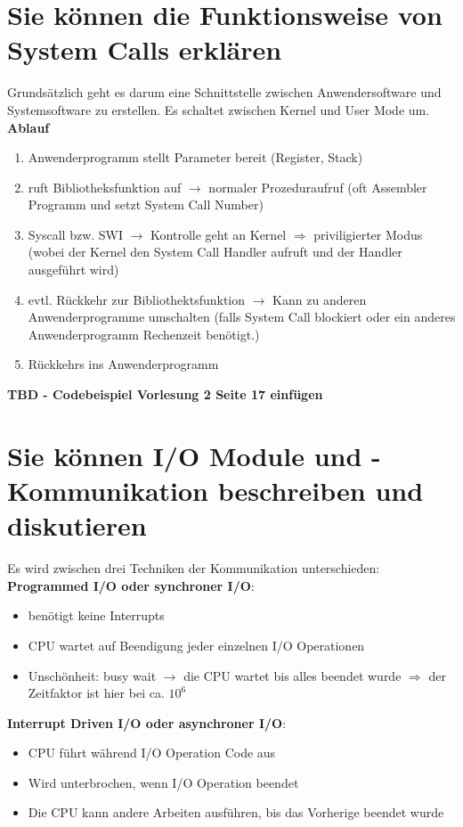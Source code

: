 \documentclass{report}
\theoremstyle{definition}
\theoremstyle{example}
\begin{document}
\section{Sie können die Funktionsweise von System Calls erklären}
Grundsätzlich geht es darum eine Schnittstelle zwischen Anwendersoftware und Systemsoftware zu erstellen. Es schaltet zwischen Kernel und User Mode um.\\
\textbf{Ablauf}\\
\begin{enumerate}
	\item Anwenderprogramm stellt Parameter bereit (Register, Stack)
	\item ruft Bibliotheksfunktion auf $\rightarrow$ normaler Prozeduraufruf (oft Assembler Programm und setzt System Call Number)
	\item Syscall bzw. SWI $\rightarrow$ Kontrolle geht an Kernel $\Rightarrow$ priviligierter Modus (wobei der Kernel den System Call Handler aufruft und der Handler ausgeführt wird)
	\item evtl. Rückkehr zur Bibliothektsfunktion $\rightarrow$ Kann zu anderen Anwenderprogramme umschalten (falls System Call blockiert oder ein anderes Anwenderprogramm Rechenzeit benötigt.)
	\item Rückkehrs ins Anwenderprogramm
\end{enumerate}

\textbf{TBD - Codebeispiel Vorlesung 2 Seite 17 einfügen}

\section{Sie können I/O Module und -Kommunikation beschreiben und diskutieren}
Es wird zwischen drei Techniken der Kommunikation unterschieden:\\
\textbf{Programmed I/O oder synchroner I/O}:\\
\begin{itemize}
	\item benötigt keine Interrupts
	\item CPU wartet auf Beendigung jeder einzelnen I/O Operationen
	\item Unschönheit: busy wait $\rightarrow$ die CPU wartet bis alles beendet wurde $\Rightarrow$ der Zeitfaktor ist hier bei ca. $10^6$
\end{itemize}

\textbf{Interrupt Driven I/O oder asynchroner I/O}:\\
\begin{itemize}
	\item CPU führt während I/O Operation Code aus
	\item Wird unterbrochen, wenn I/O Operation beendet
	\item Die CPU kann andere Arbeiten ausführen, bis das Vorherige beendet wurde
\end{itemize}
\end{document}
